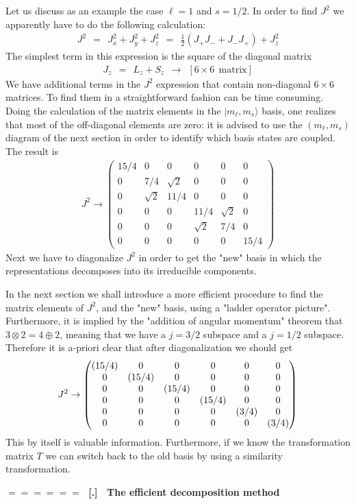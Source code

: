 \documentclass[onecolumn,fleqn]{revtex4}
\newcommand{\amatrix}[1]{\begin{matrix} #1 \end{matrix}}
\newcommand{\beq}{\begin{eqnarray}}
\newcommand{\eeq}{\end{eqnarray}}
\renewcommand{\thesubsection}{\arabic{subsection}}
\renewcommand{\thesubsubsection}{\arabic{subsubsection}}
\newcommand{\sheadC}[1]
{
\addtocounter{subsubsection}{1}
\vspace{5mm}
{\Large\bf $=\!=\!=\!=\!=\!=\;$ [\thesubsection.\thesubsubsection] \ #1}  
\nopagebreak
\phantomsection
}
\begin{document}
Let us discuss as an example the case $\ell=1$ and $s=1/2$. 
In order to find $J^2$ we apparently have to do 
the following calculation: 
\beq
J^2 
\ \ = \ \  
J_x^2+J_y^2+J_z^2
\ \ = \ \ 
\frac{1}{2}\left(J_{+}J_{-} + J_{-}J_{+} \right) + J_z^2
\eeq
The simplest term in this expression 
is the square of the diagonal matrix 
\beq
J_z \ \ =  \ \ L_z + S_z \ \ \rightarrow \ \ \left[ 6 \times 6 \ \ \mbox{matrix} \right] 
\eeq
We have additional terms in the $J^2$ expression 
that contain non-diagonal ${ 6\times6 }$ matrices. 
To find them in a straightforward fashion can be time consuming.  
Doing the calculation of the matrix elements 
in the $|m_{\ell},m_{s}\rangle$ basis, 
one realizes that most of the off-diagonal 
elements are zero: it is advised to use 
the $(m_{\ell},m_{s})$ diagram of the next section   
in order to identify which basis states are coupled.
The result is 
\beq
J^2 \rightarrow 
\left(
\begin{array}{cccccc}
{15}/{4} & 0 & 0 & 0 & 0 & 0 \\
0 & {7}/{4} & \sqrt{2} & 0 & 0 & 0 \\
0 & \sqrt{2} & 11/4 & 0 & 0 & 0 \\
0 & 0 & 0 & 11/4 & \sqrt{2} & 0 \\
0 & 0 & 0 & \sqrt{2} & {7}/{4} & 0 \\
0 & 0 & 0 & 0 & 0 & {15}/{4} 
\end{array}
\right)
\eeq
Next we have to diagonalize $J^2$ in order to get 
the "new" basis in which the representations decomposes 
into its irreducible components.  

In the next section we shall introduce a more efficient procedure 
to find the matrix elements of $J^2$, and the "new" basis, 
using a "ladder operator picture". Furthermore, it is implied by the 
"addition of angular momentum" theorem that $ 3\otimes 2 = 4 \oplus 2$, 
meaning that we have a $j=3/2$ subspace and a $j=1/2$ subspace.  
Therefore it is a-priori clear that after diagonalization we should get 
\beq
J^2 \rightarrow 
\left( 
\amatrix{ 
(15/4) & 0 & 0 & 0 & 0 & 0 \cr 
0 & (15/4) & 0 & 0 & 0 & 0 \cr 
0 & 0 & (15/4) & 0 & 0 & 0 \cr 
0 & 0 & 0 & (15/4) & 0 & 0 \cr 
0 & 0 & 0 & 0 & (3/4) & 0 \cr 
0 & 0 & 0 & 0 & 0 & (3/4) } 
\right) 
\eeq
This by itself is valuable information. Furthermore, if we know the transformation 
matrix $T$ we can switch back to the old basis by using a similarity transformation.  



\sheadC{The efficient decomposition method}
\end{document}

